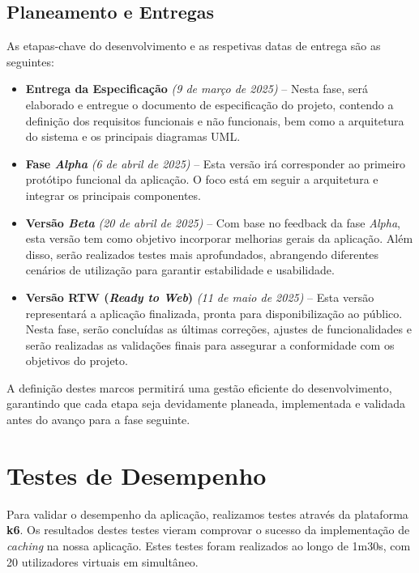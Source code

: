 \documentclass[a4paper, 12pt]{article} %
\begin{document}
\subsection{Planeamento e Entregas}

As etapas-chave do desenvolvimento e as respetivas datas de entrega são as seguintes:

\begin{itemize}
	\item \textbf{Entrega da Especificação} \textit{(9 de março de 2025)} – Nesta fase, será elaborado e entregue o documento de especificação do projeto, contendo a definição dos requisitos funcionais e não funcionais, bem como a arquitetura do sistema e os principais diagramas UML.
	
	\item \textbf{Fase \textit{Alpha}} \textit{(6 de abril de 2025)} – Esta versão irá corresponder ao primeiro protótipo funcional da aplicação. O foco está em seguir a arquitetura e integrar os principais componentes.
	
	\item \textbf{Versão \textit{Beta}} \textit{(20 de abril de 2025)} – Com base no feedback da fase \textit{Alpha}, esta versão tem como objetivo incorporar melhorias gerais da aplicação. Além disso, serão realizados testes mais aprofundados, abrangendo diferentes cenários de utilização para garantir estabilidade e usabilidade.
	
	\item \textbf{Versão RTW (\textit{Ready to Web})} \textit{(11 de maio de 2025)} – Esta versão representará a aplicação finalizada, pronta para disponibilização ao público. Nesta fase, serão concluídas as últimas correções, ajustes de funcionalidades e serão realizadas as validações finais para assegurar a conformidade com os objetivos do projeto.
\end{itemize}

A definição destes marcos permitirá uma gestão eficiente do desenvolvimento, garantindo que cada etapa seja devidamente planeada, implementada e validada antes do avanço para a fase seguinte.

\newpage
\section{Testes de Desempenho}
Para validar o desempenho da aplicação, realizamos testes através da plataforma \textbf{k6}. Os resultados destes testes vieram comprovar o sucesso da implementação de \textit{caching} na nossa aplicação. Estes testes foram realizados ao longo de 1m30s, com 20 utilizadores virtuais em simultâneo.
\end{document}

